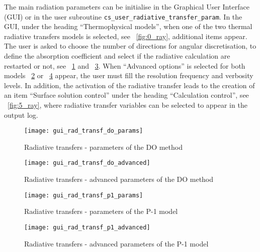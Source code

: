 {{{The main radiation parameters can be initialise in the Graphical User Interface (GUI) or in the user subroutine \texttt{cs\_user\_radiative\_transfer\_param}. In the GUI, under the heading ``Thermophysical models'', when one of the two thermal radiative transfers models is selected, see \figurename~\ref{fig:0_ray}, additional items appear. The user is asked to choose the number of directions for angular discretisation, to define the absorption coefficient and select if the radiative calculation are restarted or not,
see \figurename~\ref{fig:1_ray} and \figurename~\ref{fig:3_ray}. When ``Advanced options'' is selected for both models \figurename~\ref{fig:2_ray} or \figurename~\ref{fig:4_ray} appear, the user must fill the resolution frequency and verbosity levels. In addition, the activation of the radiative transfer leads to the creation of an item ``Surface solution control'' under the heading ``Calculation control'',
see \figurename~\ref{fig:5_ray}, where radiative transfer variables can be selected to appear in the output log.

\begin{figure}[ht]
\begin{center}
\texttt{[image: gui\_rad\_transf\_do\_params]}
\caption{Radiative transfers - parameters of the DO method}
\label{fig:1_ray}
\end{center}
\end{figure}

\begin{figure}[ht]
\begin{center}
\texttt{[image: gui\_rad\_transf\_do\_advanced]}
\caption{Radiative transfers - advanced parameters of the DO method}
\label{fig:2_ray}
\end{center}
\end{figure}

\begin{figure}[ht]
\begin{center}
\texttt{[image: gui\_rad\_transf\_p1\_params]}
\caption{Radiative transfers - parameters of the P-1 model}
\label{fig:3_ray}
\end{center}
\end{figure}

\begin{figure}[ht]
\begin{center}
\texttt{[image: gui\_rad\_transf\_p1\_advanced]}
\caption{Radiative transfers - advanced parameters of the P-1 model}
\label{fig:4_ray}
\end{center}
\end{figure}

}}}
